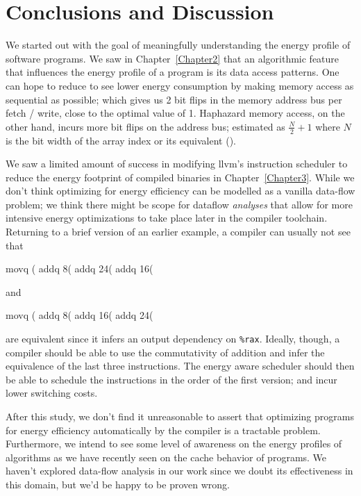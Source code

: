 \chapter{Conclusions and Discussion}

\label{Chapter4}


We started out with the goal of meaningfully understanding the energy
profile of software programs.  We saw in Chapter~\ref{Chapter2} that
an algorithmic feature that influences the energy profile of a program
is its data access patterns.  One can hope to reduce to see lower
energy consumption by making memory access as sequential as possible;
which gives us 2 bit flips in the memory address bus per fetch /
write, close to the optimal value of 1.  Haphazard memory access, on
the other hand, incurs more bit flips on the address bus; estimated as
$\frac{N}{2} + 1$ where $N$ is the bit width of the array index or its
equivalent ().

We saw a limited amount of success in modifying llvm's instruction
scheduler to reduce the energy footprint of compiled binaries in
Chapter~\ref{Chapter3}.  While we don't think optimizing for energy
efficiency can be modelled as a vanilla data-flow problem; we think
there might be scope for dataflow \textit{analyses} that allow for
more intensive energy optimizations to take place later in the
compiler toolchain.  Returning to a brief version of an earlier
example, a compiler can usually not see that

\begin{gascode}
  movq    (%
  addq    8(%
  addq    24(%
  addq    16(%
\end{gascode}

and

\begin{gascode}
  movq    (%
  addq    8(%
  addq    16(%
  addq    24(%
\end{gascode}

are equivalent since it infers an output dependency on \texttt{\%rax}.
Ideally, though, a compiler should be able to use the commutativity of
addition and infer the equivalence of the last three instructions.
The energy aware scheduler should then be able to schedule the
instructions in the order of the first version; and incur lower
switching costs.

After this study, we don't find it unreasonable to assert that
optimizing programs for energy efficiency automatically by the
compiler is a tractable problem.  Furthermore, we intend to see some
level of awareness on the energy profiles of algorithms as we have
recently seen on the cache behavior of programs.  We haven't explored
data-flow analysis in our work since we doubt its effectiveness in
this domain, but we'd be happy to be proven wrong.
